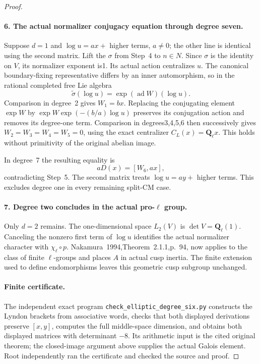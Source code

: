 \begin{proof}
\paragraph{6. The actual normalizer conjugacy equation through degree seven.}
Suppose $d=1$ and $\log u=ax+$ higher terms, $a\ne0$; the other
line is identical using the second matrix. Lift the $\sigma$ from
Step~4 to $n\in N$. Since $\sigma$ is the identity on $V$, its
normalizer exponent is1. Its actual action centralizes $u$.
The canonical boundary-fixing representative differs by an inner
automorphism, so in the rational completed free Lie algebra
\[
 \widetilde\sigma(\log u)
 =\exp(\operatorname{ad}W)(\log u).
\]
Comparison in degree~2 gives $W_1=bx$. Replacing the conjugating
element $\exp W$ by
$\exp W\exp(-(b/a)\log u)$ preserves its conjugation action and
removes its degree-one term. Comparison in degrees3,4,5,6 then
successively gives $W_2=W_3=W_4=W_5=0$, using the exact centralizer
$C_L(x)=\mathbf Q_\ell x$. This holds without primitivity of the
original abelian image.

In degree~7 the resulting equality is
\[
 aD(x)=[W_6,ax],
\]
contradicting Step~5. The second matrix treats $\log u=ay+$ higher
terms. This excludes degree one in every remaining split-CM case.

\paragraph{7. Degree two concludes in the actual pro-$\ell$ group.}
Only $d=2$ remains. The one-dimensional space $L_2(V)$ is
$\det V=\mathbf Q_\ell(1)$. Canceling the nonzero first term of
$\log u$ identifies the actual normalizer character with
$\chi_\ell\circ p$. Nakamura~1994,Theorem~2.1.1,p.~94, now applies\cite{AuditNakamura1994}
to the class of finite $\ell$-groups and places $A$ in actual cusp
inertia. The finite extension used to define endomorphisms leaves
this geometric cusp subgroup unchanged.

\paragraph{Finite certificate.}
The independent exact program \texttt{check\_elliptic\_degree\_six.py} constructs the Lyndon brackets from associative words, checks that both displayed derivations preserve $[x,y]$, computes the full middle-space dimension, and obtains both displayed matrices with determinant $-8$. Its arithmetic input is the cited original theorem; the closed-image argument above supplies the actual Galois element. Root independently ran the certificate and checked the source and proof.


\end{proof}

